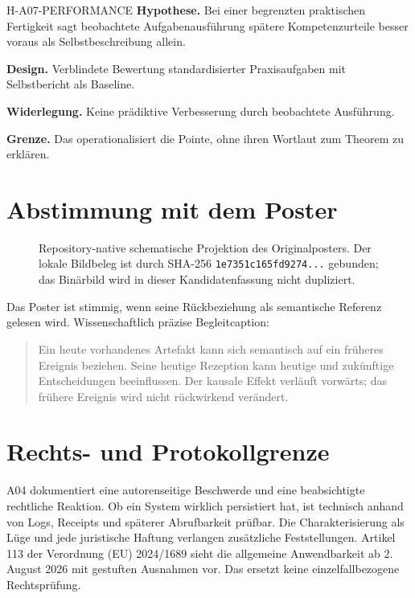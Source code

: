 \documentclass[11pt,a4paper]{article}
\begin{document}
\begin{boundarybox}{H-A07-PERFORMANCE}
\textbf{Hypothese.} Bei einer begrenzten praktischen Fertigkeit sagt beobachtete Aufgabenausführung spätere Kompetenzurteile besser voraus als Selbstbeschreibung allein.\par
\textbf{Design.} Verblindete Bewertung standardisierter Praxisaufgaben mit Selbstbericht als Baseline.\par
\textbf{Widerlegung.} Keine prädiktive Verbesserung durch beobachtete Ausführung.\par
\textbf{Grenze.} Das operationalisiert die Pointe, ohne ihren Wortlaut zum Theorem zu erklären.
\end{boundarybox}

\section{Abstimmung mit dem Poster}
\begin{figure}[htbp]
\centering
{}
\caption{Repository-native schematische Projektion des Originalposters. Der lokale Bildbeleg ist durch SHA-256 \texttt{1e7351c165fd9274...} gebunden; das Binärbild wird in dieser Kandidatenfassung nicht dupliziert.}
\end{figure}

Das Poster ist stimmig, wenn seine Rückbeziehung als semantische Referenz gelesen wird. Wissenschaftlich präzise Begleitcaption:
\begin{quote}
Ein heute vorhandenes Artefakt kann sich semantisch auf ein früheres Ereignis beziehen. Seine heutige Rezeption kann heutige und zukünftige Entscheidungen beeinflussen. Der kausale Effekt verläuft vorwärts; das frühere Ereignis wird nicht rückwirkend verändert.
\end{quote}

\section{Rechts- und Protokollgrenze}
A04 dokumentiert eine autorenseitige Beschwerde und eine beabsichtigte rechtliche Reaktion. Ob ein System wirklich persistiert hat, ist technisch anhand von Logs, Receipts und späterer Abrufbarkeit prüfbar. Die Charakterisierung als Lüge und jede juristische Haftung verlangen zusätzliche Feststellungen. Artikel 113 der Verordnung (EU) 2024/1689 sieht die allgemeine Anwendbarkeit ab 2. August 2026 mit gestuften Ausnahmen vor. Das ersetzt keine einzelfallbezogene Rechtsprüfung.
\end{document}
